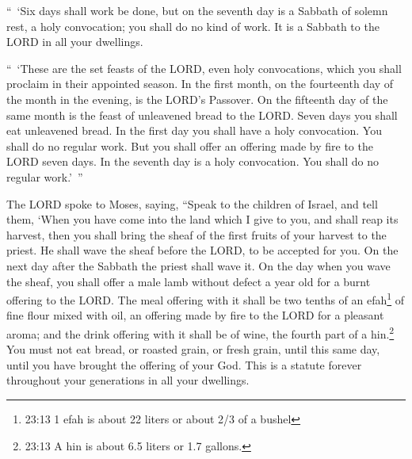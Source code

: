 \myverse{}“ ‘Six days shall work be done, but on the seventh day is a Sabbath
of solemn rest, a holy convocation; you shall do no kind of work. It is a Sabbath to the LORD in all your
dwellings.


\myverse{}“ ‘These are the set feasts of the LORD, even holy convocations,
which you shall proclaim in their appointed season.
\myverse{}In the first month, on the fourteenth day of the month in the evening, is the
LORD’s Passover.
\myverse{}On the fifteenth day of the same month is the feast of unleavened bread to
the LORD. Seven days you shall eat unleavened bread.
\myverse{}In the first day you shall have a holy convocation. You shall do no regular
work.
\myverse{}But you shall offer an offering made by fire to the LORD seven days. In the
seventh day is a holy convocation. You shall do no regular work.’ ”


\myverse{}The LORD spoke to Moses, saying,
\myverse{}“Speak to the children of Israel, and tell them, ‘When you have come into
the land which I give to you, and shall reap its harvest, then you shall bring the sheaf of the first
fruits of your harvest to the priest.
\myverse{}He shall wave the sheaf before the LORD, to be accepted for you. On the next
day after the Sabbath the priest shall wave it.
\myverse{}On the day when you wave the sheaf, you shall offer a male lamb without defect
a year old for a burnt offering to the LORD.
\myverse{}The meal offering with it shall be two tenths of an efah\footnote{23:13 1 efah is about 22 liters or about 2/3 of a bushel} of fine flour mixed with oil, an
offering made by fire to the LORD for a pleasant aroma; and the drink offering with it shall be of wine,
the fourth part of a hin.\footnote{23:13 A hin is about 6.5 liters or 1.7 gallons.}
\myverse{}You must not eat bread, or roasted grain, or fresh grain, until this same
day, until you have brought the offering of your God. This is a statute forever throughout your generations
in all your dwellings.


